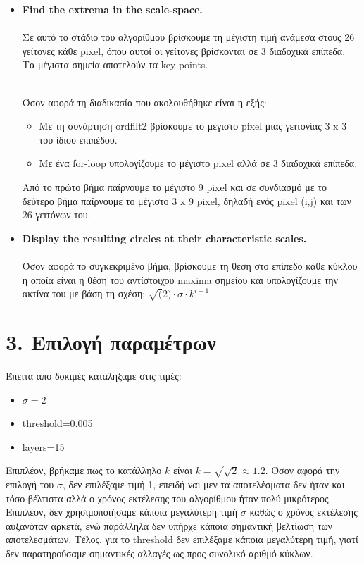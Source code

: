 \documentclass{article}
\newcommand{\tl}[1]{\textlatin{#1}}
\begin{document}
\begin{itemize}
		\newpage		
		\item \textbf{\tl{Find the extrema in the scale-space.}}\\\\ \noindent
		Σε αυτό το στάδιο του αλγορίθμου βρίσκουμε τη μέγιστη τιμή ανάμεσα στους 26 γείτονες κάθε \tl{pixel}, όπου αυτοί οι γείτονες βρίσκονται σε 3 διαδοχικά επίπεδα. Τα μέγιστα σημεία αποτελούν τα \tl{key points}.\\\\
		\noindent
		
		Όσον αφορά τη διαδικασία που ακολουθήθηκε είναι η εξής: 
		\begin{itemize}
			\item Mε τη συνάρτηση \tl{ordfilt2} βρίσκουμε το μέγιστο \tl{pixel} μιας γειτονίας 3 \tl{x} 3 του ίδιου επιπέδου.
			\item Mε ένα \tl{for-loop} υπολογίζουμε το μέγιστο \tl{pixel} αλλά σε 3 διαδοχικά επίπεδα. 
		\end{itemize}
		\noindent
		Από το πρώτο βήμα παίρνουμε το μέγιστο 9 \tl{pixel} και σε συνδιασμό με το δεύτερο βήμα παίρνουμε το μέγιστο 3 \tl{x} 9 \tl{pixel}, δηλαδή ενός \tl{pixel (i,j)} και των 26 γειτόνων του.
		\item \textbf{\tl{Display the resulting circles at their characteristic scales.}}\\\\ \noindent
		Όσον αφορά το συγκεκριμένο βήμα, βρίσκουμε τη θέση στο επίπεδο κάθε κύκλου η οποία είναι η θέση του αντίστοιχου \tl{maxima} σημείου και υπολογίζουμε την ακτίνα του με βάση τη σχέση: $\sqrt(2)\cdot \sigma \cdot k^{i-1}$
	\end{itemize}

	\section*{3. Επιλογή παραμέτρων}
	Έπειτα απο δοκιμές καταλήξαμε στις τιμές:
	\begin{itemize}
		\item $\sigma = 2$ 
		\item \tl{threshold}=0.005
		\item \tl{layers}=15
	\end{itemize}
	\noindent
	Επιπλέον, βρήκαμε πως το κατάλληλο $k$ είναι $k=\sqrt{\sqrt{2}} \approx 1.2$. Όσον αφορά την επιλογή του $\sigma$, δεν επιλέξαμε τιμή 1,
	επειδή ναι μεν τα αποτελέσματα δεν ήταν και τόσο βέλτιστα αλλά ο χρόνος εκτέλεσης του αλγορίθμου ήταν πολύ μικρότερος. Επιπλέον, δεν 
	χρησιμοποιήσαμε κάποια μεγαλύτερη τιμή $\sigma$ καθώς ο χρόνος εκτέλεσης αυξανόταν αρκετά, ενώ παράλληλα δεν υπήρχε κάποια σημαντική 
	βελτίωση των αποτελεσμάτων. Τέλος, για το \tl{threshold} δεν επιλέξαμε κάποια μεγαλύτερη τιμή, γιατί δεν παρατηρούσαμε σημαντικές αλλαγές 
	ως προς συνολικό αριθμό κύκλων.
	\\\\\
\end{document}

